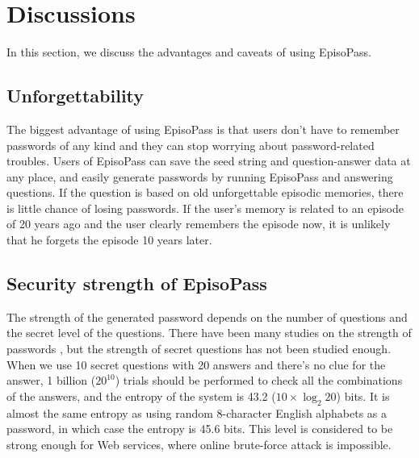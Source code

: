 \documentclass[runningheads,a4paper]{llncs}
\begin{document}
\section{Discussions}

In this section, we discuss the advantages and caveats of
using EpisoPass.

\subsection{Unforgettability}

The biggest advantage of using EpisoPass is that
users don't have to remember passwords of any kind and
they can stop worrying about password-related troubles.
%
Users of EpisoPass can save the seed string and question-answer data
at any place, and easily generate passwords by running
EpisoPass and answering questions.
If the question is based on old unforgettable episodic memories,
there is little chance of losing passwords.
If the user's memory is related to an episode of 20 years ago and the user clearly
remembers the episode now, it is unlikely that he forgets the episode 10 years later.

\subsection{Security strength of EpisoPass}

The strength of the generated password depends on the number of
questions and the secret level of the questions.
%
There have been many studies on the strength of passwords
\cite{Hayashi:2011:DSP:1978942.1979326}%
\cite{Komanduri:2011:PPM:1978942.1979321}, %
but the strength of secret questions has not been studied enough.
%
%
When we use 10 secret questions with 20 answers and
there's no clue for the answer,
1 billion ($20^{10}$) trials should be performed to check
all the combinations of the answers,
and the entropy of the system is 43.2 ($10 \times \log_2 20$) bits.  %
%
%
It is almost the same entropy as using random 8-character English alphabets
as a password, in which case the entropy is 45.6 bits.
This level is considered to be strong enough for Web services,
where online brute-force attack is impossible\cite{Florencio:2007:SWP:1361419.1361429}.
\end{document}
